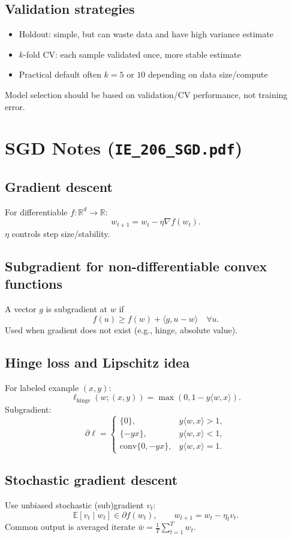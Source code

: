 \documentclass[11pt]{article}
\newcommand{\R}{\mathbb{R}}
\newcommand{\E}{\mathbb{E}}
\newcommand{\1}{\mathbf{1}}
\begin{document}
\subsection*{Validation strategies}
\begin{itemize}
\item Holdout: simple, but can waste data and have high variance estimate
\item $k$-fold CV: each sample validated once, more stable estimate
\item Practical default often $k=5$ or $10$ depending on data size/compute
\end{itemize}
Model selection should be based on validation/CV performance, not training error.

\section{SGD Notes (\texttt{IE\_206\_SGD.pdf})}
\subsection*{Gradient descent}
For differentiable $f:\R^d\to\R$:
\[
 w_{t+1}=w_t-\eta\nabla f(w_t).
\]
$\eta$ controls step size/stability.

\subsection*{Subgradient for non-differentiable convex functions}
A vector $g$ is subgradient at $w$ if
\[
f(u)\ge f(w)+\langle g,u-w\rangle\quad\forall u.
\]
Used when gradient does not exist (e.g., hinge, absolute value).

\subsection*{Hinge loss and Lipschitz idea}
For labeled example $(x,y)$:
\[
\ell_{\text{hinge}}(w;(x,y))=\max(0,1-y\langle w,x\rangle).
\]
Subgradient:
\[
\partial \ell=
\begin{cases}
\{0\}, & y\langle w,x\rangle>1,\\
\{-yx\}, & y\langle w,x\rangle<1,\\
\text{conv}\{0,-yx\}, & y\langle w,x\rangle=1.
\end{cases}
\]

\subsection*{Stochastic gradient descent}
Use unbiased stochastic (sub)gradient $v_t$:
\[
\E[v_t\mid w_t]\in\partial f(w_t),
\qquad
w_{t+1}=w_t-\eta_t v_t.
\]
Common output is averaged iterate $\bar w=\frac{1}{T}\sum_{t=1}^T w_t$.
\end{document}
